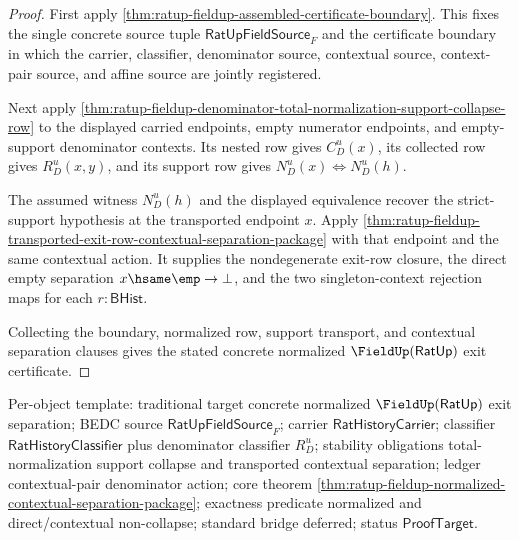 \begin{proof}
First apply \autoref{thm:ratup-fieldup-assembled-certificate-boundary}. This
fixes the single concrete source tuple $\mathsf{RatUpFieldSource}_F$ and the
certificate boundary in which the carrier, classifier, denominator source,
contextual source, context-pair source, and affine source are jointly registered.

Next apply
\autoref{thm:ratup-fieldup-denominator-total-normalization-support-collapse-row}
to the displayed carried endpoints, empty numerator endpoints, and
empty-support denominator contexts. Its nested row gives $C_D^u(x)$, its
collected row gives $R_D^u(x,y)$, and its support row gives
$N_D^u(x)\Longleftrightarrow N_D^u(h)$.

The assumed witness $N_D^u(h)$ and the displayed equivalence recover the
strict-support hypothesis at the transported endpoint $x$. Apply
\autoref{thm:ratup-fieldup-transported-exit-row-contextual-separation-package}
with that endpoint and the same contextual action. It supplies the
nondegenerate exit-row closure, the direct empty separation
$x\hsame\emp\to\bot$, and the two singleton-context rejection maps for each
$r:\mathsf{BHist}$.

Collecting the boundary, normalized row, support transport, and contextual
separation clauses gives the stated concrete normalized
$\FieldUp(\mathsf{RatUp})$ exit certificate.
\end{proof}

Per-object template: traditional target concrete normalized
$\FieldUp(\mathsf{RatUp})$ exit separation; BEDC source
$\mathsf{RatUpFieldSource}_F$; carrier $\mathsf{RatHistoryCarrier}$;
classifier $\mathsf{RatHistoryClassifier}$ plus denominator classifier
$R_D^u$; stability obligations total-normalization support collapse and
transported contextual separation; ledger contextual-pair denominator action;
core theorem
\autoref{thm:ratup-fieldup-normalized-contextual-separation-package}; exactness
predicate normalized and direct/contextual non-collapse; standard bridge
deferred; status $\mathsf{ProofTarget}$.


